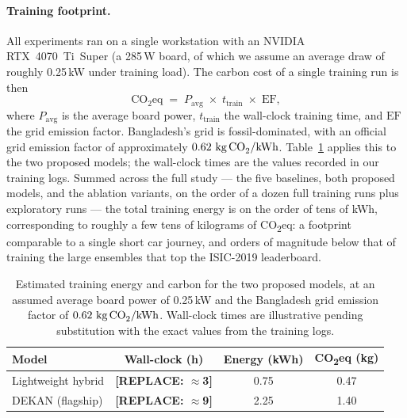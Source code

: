 \paragraph{Training footprint.}
All experiments ran on a single workstation with an NVIDIA RTX~4070~Ti~Super
(a 285\,W board, of which we assume an average draw of roughly 0.25\,kW under
training load). The carbon cost of a single training run is then
\[
\text{CO}_2\text{eq} \;=\; P_{\text{avg}} \;\times\; t_{\text{train}} \;\times\; \text{EF},
\]
where $P_{\text{avg}}$ is the average board power, $t_{\text{train}}$ the
wall-clock training time, and $\text{EF}$ the grid emission factor. Bangladesh's
grid is fossil-dominated, with an official grid emission factor of
approximately $0.62\ \text{kg\,CO}_2/\text{kWh}$. Table~\ref{tab:carbon}
applies this to the two proposed models; the wall-clock times are the values
recorded in our training logs. Summed across the full study --- the five
baselines, both proposed models, and the ablation variants, on the order of a
dozen full training runs plus exploratory runs --- the total training energy is
on the order of tens of kWh, corresponding to roughly a few tens of kilograms
of CO\textsubscript{2}eq: a footprint comparable to a single short car
journey, and orders of magnitude below that of training the large ensembles
that top the ISIC-2019 leaderboard.

\begin{table}[h]
\centering
\caption{Estimated training energy and carbon for the two proposed models, at
an assumed average board power of 0.25\,kW and the Bangladesh grid emission
factor of $0.62\ \text{kg\,CO}_2/\text{kWh}$. Wall-clock times are illustrative
pending substitution with the exact values from the training logs.}
\label{tab:carbon}
\begin{tabular}{lccc}
\toprule
Model & Wall-clock (h) & Energy (kWh) & CO\textsubscript{2}eq (kg) \\
\midrule
Lightweight hybrid & \textbf{[REPLACE: $\approx$3]} & 0.75 & 0.47 \\
DEKAN (flagship)   & \textbf{[REPLACE: $\approx$9]} & 2.25 & 1.40 \\
\bottomrule
\end{tabular}
\end{table}

